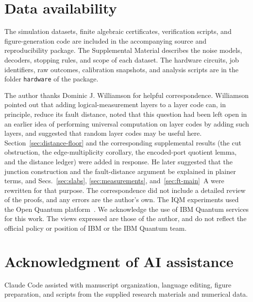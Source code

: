 \section*{Data availability}
The simulation datasets, finite algebraic certificates, verification scripts,
and figure-generation code are included in the accompanying source and
reproducibility package. The Supplemental Material describes the noise models,
decoders, stopping rules, and scope of each dataset.  The hardware circuits,
job identifiers, raw outcomes, calibration snapshots, and analysis scripts are
in the folder \texttt{hardware} of the package.

\begin{acknowledgments}
The author thanks Dominic J. Williamson for helpful correspondence. Williamson
pointed out that adding logical-measurement layers to a layer code can, in
principle, reduce its fault distance, noted that this question had been left
open in an earlier idea of performing universal computation on layer codes by
adding such layers, and suggested that random layer codes
\cite{GuRandomLayerCodes2026} may be useful here.
Section~\ref{sec:distance-floor} and the corresponding supplemental results
(the cut obstruction, the edge-multiplicity corollary, the encoded-port
quotient lemma, and the distance ledger) were added in response.  He later
suggested that the junction construction and the fault-distance argument be
explained in plainer terms, and Secs.~\ref{sec:slabs}, \ref{sec:measurements},
and~\ref{sec:ft-main}~A were rewritten for that purpose.  The
correspondence did not include a detailed review of the proofs, and any
errors are the author's own.  The IQM experiments used the Open Quantum
platform~\cite{OpenQuantum2026}.  We acknowledge the use of IBM Quantum
services for this work.  The views expressed are those of the author, and do
not reflect the official policy or position of IBM or the IBM Quantum team.
\end{acknowledgments}

\section*{Acknowledgment of AI assistance}
Claude Code assisted with manuscript organization, language editing, figure
preparation, and scripts from the supplied research materials and numerical
data.


